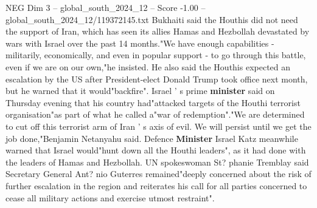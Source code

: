 \begin{textsample}{NEG Dim 3 – global\_south\_2024\_12 – Score -1.00 – global\_south\_2024\_12/119372145.txt}
Bukhaiti said the Houthis did not need the support of Iran, which has seen its allies Hamas and Hezbollah devastated by wars with Israel over the past 14 months."We have enough capabilities - militarily, economically, and even in popular support - to go through this battle, even if we are on our own,"he insisted.
He also said the Houthis expected an escalation by the US after President-elect Donald Trump took office next month, but he warned that it would"backfire".
Israel ' s prime \textbf{minister} said on Thursday evening that his country had"attacked targets of the Houthi terrorist organisation"as part of what he called a"war of redemption"."We are determined to cut off this terrorist arm of Iran ' s axis of evil.
We will persist until we get the job done,"Benjamin Netanyahu said.
Defence \textbf{Minister} Israel Katz meanwhile warned that Israel would"hunt down all the Houthi leaders", as it had done with the leaders of Hamas and Hezbollah.
UN spokeswoman St? phanie Tremblay said Secretary General Ant? nio Guterres remained"deeply concerned about the risk of further escalation in the region and reiterates his call for all parties concerned to cease all military actions and exercise utmost restraint".

\end{textsample}
